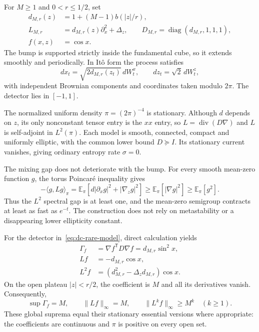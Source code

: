For $M\geq1$ and $0<r\leq1/2$, set
\begin{equation}
 \begin{split}
 d_{M,r}(z)&=1+(M-1)b(|z|/r),\\
 L_{M,r}&=d_{M,r}(z)\partial_x^2+\Delta_z,\qquad
 D_{M,r}=\operatorname{diag}(d_{M,r},1,1,1),\\
 f(x,z)&=\cos x.
 \end{split}
 \label{eq:dc-rare-model}
\end{equation}
The bump is supported strictly inside the fundamental cube, so it extends
smoothly and periodically. In It\^o form the process satisfies
\[
 dx_t=\sqrt{2d_{M,r}(z_t)}\,dW_t^x,
 \qquad dz_t=\sqrt2\,dW_t^z,
\]
with independent Brownian components and coordinates taken modulo $2\pi$.
The detector lies in $[-1,1]$.

The normalized uniform density $\pi=(2\pi)^{-4}$ is stationary. Although
$d$ depends on $z$, its only nonconstant tensor entry is the $xx$ entry,
so $L=\operatorname{div}(D\nabla)$ and $L$ is self-adjoint in $L^2(\pi)$.
Each model is smooth, connected, compact and uniformly elliptic, with the
common lower bound $D\succeq I$. Its stationary current vanishes, giving
ordinary entropy rate $\sigma=0$.

The mixing gap does not deteriorate with the bump. For every smooth
mean-zero function $g$, the torus Poincar\'e inequality gives
\begin{equation}
 -\langle g,Lg\rangle_\pi
 =\mathbb E_\pi[d|\partial_xg|^2+|\nabla_zg|^2]
 \geq\mathbb E_\pi[|\nabla g|^2]
 \geq\mathbb E_\pi[g^2].
 \label{eq:dc-common-gap}
\end{equation}
Thus the $L^2$ spectral gap is at least one, and the mean-zero semigroup
contracts at least as fast as $e^{-t}$. The construction does not rely on
metastability or a disappearing lower ellipticity constant.

For the detector in~\eqref{eq:dc-rare-model}, direct calculation yields
\begin{align}
 \Gamma_f&=\nabla f^{\mathsf T}D\nabla f=d_{M,r}\sin^2x,\\
 Lf&=-d_{M,r}\cos x,\\
 L^2f&=(d_{M,r}^2-\Delta_zd_{M,r})\cos x.
 \label{eq:dc-rare-generator}
\end{align}
On the open plateau $|z|<r/2$, the coefficient is $M$ and all its
derivatives vanish. Consequently,
\begin{equation}
 \sup\Gamma_f=M,\qquad \|Lf\|_\infty=M,\qquad
 \|L^kf\|_\infty\geq M^k\quad(k\geq1).
 \label{eq:dc-diverging-targets}
\end{equation}
These global suprema equal their stationary essential versions where
appropriate: the coefficients are continuous and $\pi$ is positive on
every open set.


